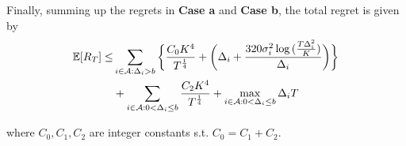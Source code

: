 \begin{customproof}{1}

Finally, summing up the regrets in \textbf{Case a} and \textbf{Case b}, the total regret is given by
\begin{align*}
\mathbb{E} [R_{T}] \leq &\sum\limits_{i\in \mathcal{A} :\Delta_{i} > b}\bigg\lbrace \dfrac{C_0 K^{4}}{T^{\frac{1}{4}}} + \bigg(\Delta_{i}+\dfrac{320\sigma_i^2\log{(\frac{T\Delta_{i}^{2}}{K})}}{\Delta_{i}}\bigg)\bigg \rbrace\\ 
  & +\sum\limits_{i\in \mathcal{A} :0 < \Delta_{i}\leq b} \dfrac{C_2 K^{4}}{T^{\frac{1}{4}}} + \max_{i\in \mathcal{A} :0 < \Delta_{i}\leq b}\Delta_{i}T
\end{align*}

where $C_0, C_1, C_2$ are integer constants s.t. $C_0 = C_1 + C_2$.
\end{customproof}


